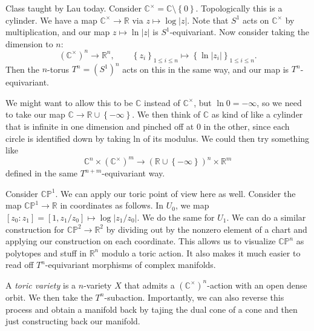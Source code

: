 
Class taught by Lau today. Consider $\mathbb{C} ^{\times } =\mathbb{C} \setminus \left\{ 0 \right\} $. Topologically this is a cylinder. We have a map $\mathbb{C} ^\times \to \mathbb{R} $ via $z\mapsto \log \left| z \right| $. Note that $S^1$ acts on $\mathbb{C} ^{\times } $ by multiplication, and our map $z\mapsto \ln \left| z \right| $ is $S^1$-equivariant. Now consider taking the dimension to $n$:
\[
	(\mathbb{C} ^\times )^n \to \mathbb{R} ^n,\qquad \left\{ z_i \right\}_{1\leq i\leq n} \mapsto \left\{ \ln  \left| z_i \right|  \right\}_{1\leq i\leq n} 
.\]
Then the $n$-torus $T^n = (S^1)^n$ acts on this in the same way, and our map is $T^n$-equivariant.

We might want to allow this to be $\mathbb{C} $ instead of $\mathbb{C} ^{\times } $, but $\ln 0=-\infty $, so we need to take our map $\mathbb{C} \to \mathbb{R} \cup \left\{ -\infty  \right\} $. We then think of $\mathbb{C} $ as kind of like a cylinder that is infinite in one dimension and pinched off at 0 in the other, since each circle is identified down by taking ln of its modulus. We could then try something like
\[
	\mathbb{C} ^n\times \left( \mathbb{C} ^{\times }  \right) ^m \to \left( \mathbb{R} \cup \left\{ -\infty  \right\}  \right) ^n \times \mathbb{R} ^m
\]
defined in the same $T^{n+m} $-equivariant way.

Consider $\mathbb{C} \mathbb{P} ^1$. We can apply our toric point of view here as well. Consider the map $\mathbb{C} \mathbb{P} ^1 \to \mathbb{R} $ in coordinates as follows. In $U_0$, we map $[z_0 : z_1] = [1,z_1 / z_0]\mapsto \log \left| z_1 / z_0 \right| $. We do the same for $U_1$. We can do a similar construction for $\mathbb{C} \mathbb{P} ^2\to \mathbb{R} ^2$ by dividing out by the nonzero element of a chart and applying our construction on each coordinate. This allows us to visualize $\mathbb{C} \mathbb{P}^n$  as polytopes and stuff in $\mathbb{R} ^n$ modulo a toric action. It also makes it much easier to read off $T^n$-equivariant morphisms of complex manifolds.

A \emph{toric variety} is a $n$-variety $X$ that admits a $(\mathbb{C} ^\times )^n$-action with an open dense orbit. We then take the $T^n$-subaction. Importantly, we can also reverse this process and obtain a manifold back by tajing the dual cone of a cone and then just constructing back our manifold.
